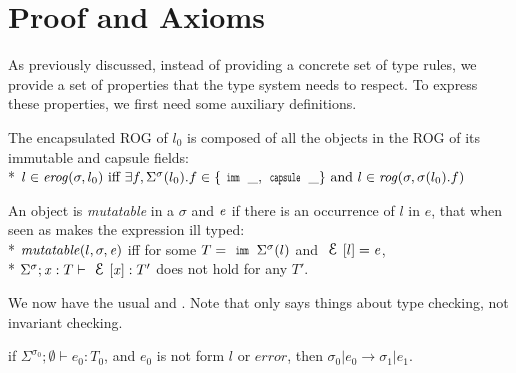 \clearpage
\section{Proof and Axioms}
\label{s:proof}

As previously discussed, instead of providing a concrete set of type rules, we provide a set of properties
that the type system needs to respect.
To express these properties, we first need some auxiliary definitions.


The encapsulated ROG of $l_0$ is composed of all the objects
in the ROG of its immutable and capsule fields:\\*
\indent $l \in \mathit{erog}(\sigma,l_0)
\text{ iff } \exists f, \Sigma^\sigma(l_0).f \in \{\Kw{imm}\,\_,\Kw{capsule}\,\_\}
\text{ and } l \in \mathit{rog}(\sigma,\sigma(l_0).f)$%

\noindent An object is \emph{mutatable} in a $\sigma$ and  ${\mathit{e}}$ if there is an occurrence of 
$l$ in $e$, that when seen as \Q@imm@ makes the expression ill typed:\\*
\indent $\mathit{mutatable}(l,\sigma,{\mathit{e}})$ iff for some $T=\Kw{imm}\,\Sigma^\sigma(l)$ and $\ctx[l]=\e$,\\*
\indent \indent $\Sigma^\sigma;\x:T\vdash\ctx[\x]:T'$ does not hold for any $T'$.%



We now have the usual  and . Note that  only says things about type checking, not invariant checking.\saveSpace\saveSpace
\begin{Assumption}[Progress]\rm
	if $\Sigma^{\sigma_0};\emptyset\vdash e_0: T_0$,
	and $e_0$ is not form $l$ or $\mathit{error}$, then
	$\sigma_0|e_0\rightarrow \sigma_1|e_1$.
\end{Assumption}

